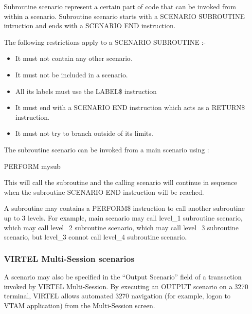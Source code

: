 \documentclass[letterpaper,10pt,english]{sphinxmanual}
\begin{document}
Subroutine scenario represent a certain part of code that can be invoked from within a scenario.
Subroutine scenario starts with a SCENARIO SUBROUTINE intruction and ends with a SCENARIO END instruction.

\begin{sphinxVerbatim}[commandchars=\\\{\}]
  
  
 
\end{sphinxVerbatim}

The following restrictions apply to a SCENARIO SUBROUTINE :-
\begin{itemize}
\item {} 
It must not contain any other scenario.

\item {} 
It must not be included in a scenario.

\item {} 
All its labels must use the LABEL\$ instruction

\item {} 
It must end with a SCENARIO END instruction which acts as a RETURN\$ instruction.

\item {} 
It must not try to branch outside of its limits.

\end{itemize}

The subroutine scenario can be invoked from a main scenario using :

\begin{sphinxVerbatim}[commandchars=\\\{\}]
PERFORM\PYGZdl{} mysub
\end{sphinxVerbatim}

This will call the subroutine and the calling scenario will continue in sequence when the subroutine SCENARIO END
instruction will be reached.

A subroutine may contains a PERFORM\$ instruction to call another subroutine up to 3 levels. For example, main
scenario may call level\_1 subroutine scenario, which may call level\_2 subroutine scenario, which may call level\_3
subroutine scenario, but level\_3 connot call level\_4 subroutine scenario.


\subsubsection{VIRTEL Multi-Session scenarios}
\label{\detokenize{User_Guide:virtel-multi-session-scenarios}}
A scenario may also be specified in the “Output Scenario” field of a transaction invoked by VIRTEL Multi-Session. By
executing an OUTPUT scenario on a 3270 terminal, VIRTEL allows automated 3270 navigation (for example, logon to
VTAM application) from the Multi-Session screen.
\end{document}
